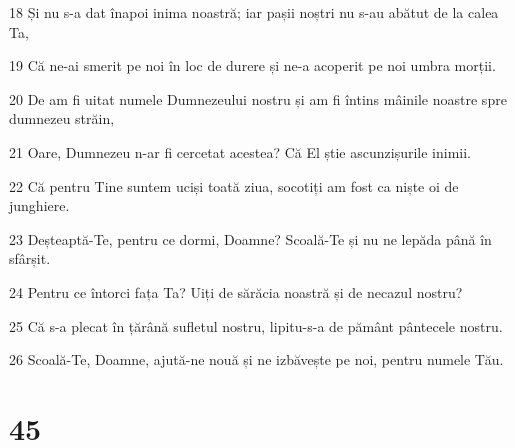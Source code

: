 \par 18 Și nu s-a dat înapoi inima noastră; iar pașii noștri nu s-au abătut de la calea Ta,
\par 19 Că ne-ai smerit pe noi în loc de durere și ne-a acoperit pe noi umbra morții.
\par 20 De am fi uitat numele Dumnezeului nostru și am fi întins mâinile noastre spre dumnezeu străin,
\par 21 Oare, Dumnezeu n-ar fi cercetat acestea? Că El știe ascunzișurile inimii.
\par 22 Că pentru Tine suntem uciși toată ziua, socotiți am fost ca niște oi de junghiere.
\par 23 Deșteaptă-Te, pentru ce dormi, Doamne? Scoală-Te și nu ne lepăda până în sfârșit.
\par 24 Pentru ce întorci fața Ta? Uiți de sărăcia noastră și de necazul nostru?
\par 25 Că s-a plecat în țărână sufletul nostru, lipitu-s-a de pământ pântecele nostru.
\par 26 Scoală-Te, Doamne, ajută-ne nouă și ne izbăvește pe noi, pentru numele Tău.

\chapter{45}

